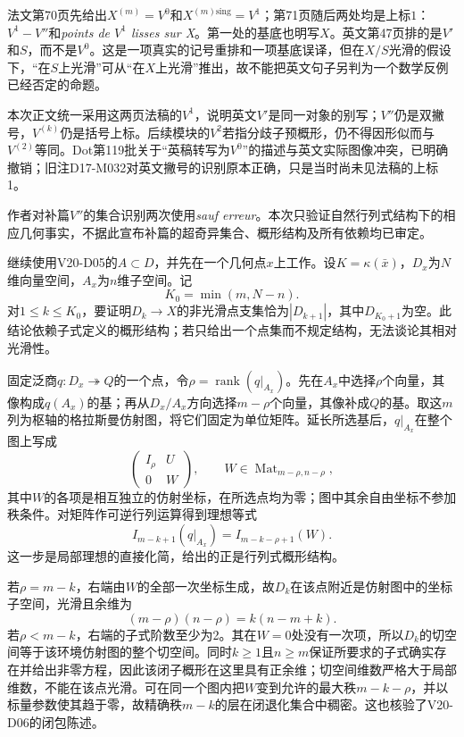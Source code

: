 法文第70页先给出$X^{(m)}=V^0$和$X^{(m)\mathrm{sing}}=V^1$；第71页随后两处均是上标$1$：$V^1-V''$和\emph{points de $V^1$ lisses sur X}。第一处的基底也明写$X$。英文第47页排的是$V'$和$S$，而不是$V^0$。这是一项真实的记号重排和一项基底误译，但在$X/S$光滑的假设下，“在$S$上光滑”可从“在$X$上光滑”推出，故不能把英文句子另判为一个数学反例已经否定的命题。

本次正文统一采用这两页法稿的$V^1$，说明英文$V'$是同一对象的别写；$V''$仍是双撇号，$V^{(k)}$仍是括号上标。后续模块的$V^2$若指分歧子预概形，仍不得因形似而与$V^{(2)}$等同。Dot第119批关于“英稿转写为$V^0$”的描述与英文实际图像冲突，已明确撤销；旧注D17-M032对英文撇号的识别原本正确，只是当时尚未见法稿的上标1。

作者对补篇$V''$的集合识别两次使用\emph{sauf erreur}。本次只验证自然行列式结构下的相应几何事实，不据此宣布补篇的超奇异集合、概形结构及所有依赖均已审定。

继续使用V20-D05的$A\subset D$，并先在一个几何点$x$上工作。设$K=\kappa(\bar x)$，$D_x$为$N$维向量空间，$A_x$为$n$维子空间。记
\[
K_0=\min(m,N-n).
\]
对$1\leq k\leq K_0$，要证明$D_k\to X$的非光滑点支集恰为$|D_{k+1}|$，其中$D_{K_0+1}$为空。此结论依赖子式定义的概形结构；若只给出一个点集而不规定结构，无法谈论其相对光滑性。

固定泛商$q\colon D_x\twoheadrightarrow Q$的一个点，令$\rho=\operatorname{rank}(q|_{A_x})$。先在$A_x$中选择$\rho$个向量，其像构成$q(A_x)$的基；再从$D_x/A_x$方向选择$m-\rho$个向量，其像补成$Q$的基。取这$m$列为枢轴的格拉斯曼仿射图，将它们固定为单位矩阵。延长所选基后，$q|_{A_x}$在整个图上写成
\[
\begin{pmatrix}
I_\rho&U\\
0&W
\end{pmatrix},
\qquad
W\in\operatorname{Mat}_{m-\rho,n-\rho},
\]
其中$W$的各项是相互独立的仿射坐标，在所选点均为零；图中其余自由坐标不参加秩条件。对矩阵作可逆行列运算得到理想等式
\[
I_{m-k+1}(q|_{A_x})
=I_{m-k-\rho+1}(W).
\]
这一步是局部理想的直接化简，给出的正是行列式概形结构。

若$\rho=m-k$，右端由$W$的全部一次坐标生成，故$D_k$在该点附近是仿射图中的坐标子空间，光滑且余维为
\[
(m-\rho)(n-\rho)=k(n-m+k).
\]
若$\rho<m-k$，右端的子式阶数至少为2。其在$W=0$处没有一次项，所以$D_k$的切空间等于该环境仿射图的整个切空间。同时$k\geq1$且$n\geq m$保证所要求的子式确实存在并给出非零方程，因此该闭子概形在这里具有正余维；切空间维数严格大于局部维数，不能在该点光滑。可在同一个图内把$W$变到允许的最大秩$m-k-\rho$，并以标量参数使其趋于零，故精确秩$m-k$的层在闭退化集合中稠密。这也核验了V20-D06的闭包陈述。

